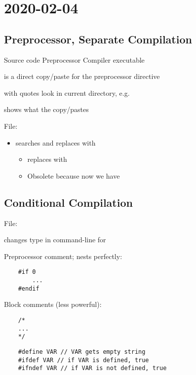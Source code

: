 \section{2020-02-04}
\subsection{Preprocessor, Separate Compilation}
Source code \textrightarrow{} Preprocessor \textrightarrow{} Compiler
\textrightarrow{}  executable

 is a direct copy/paste for the preprocessor directive

 with quotes \textrightarrow{} look in current directory,
e.g. 

 shows what the  copy/pastes


File: 

\begin{itemize}
      \item {} \textrightarrow{} searches and replaces
             with 
            \begin{itemize}
                  \item {} \textrightarrow{} replaces  with 
                  \item Obsolete because now we have 
            \end{itemize}
\end{itemize}

\subsection{Conditional Compilation}
File: 

 \textrightarrow{} changes type in command-line
for 

Preprocessor comment; nests perfectly:
\begin{lstlisting}
    #if 0
        ...
    #endif
\end{lstlisting}

Block comments (less powerful):
\begin{lstlisting}
    /*
    ...
    */
\end{lstlisting}

\begin{lstlisting}
    #define VAR // VAR gets empty string
    #ifdef VAR // if VAR is defined, true
    #ifndef VAR // if VAR is not defined, true
\end{lstlisting}

